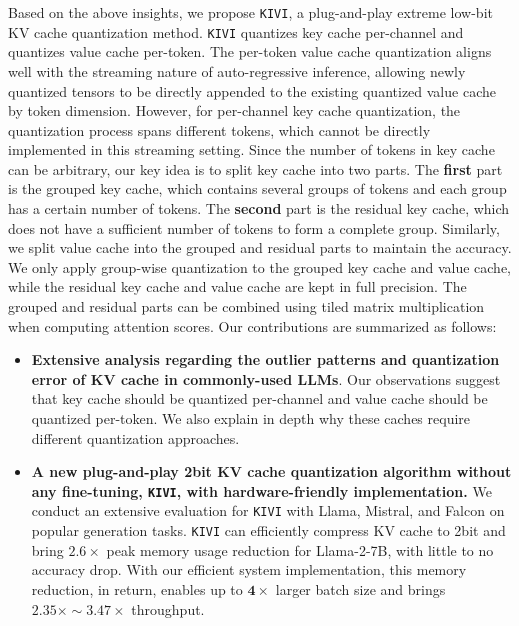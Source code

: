 Based on the above insights, we propose \texttt{KIVI}, a plug-and-play extreme low-bit KV cache quantization method.
\texttt{KIVI} quantizes key cache per-channel and quantizes value cache per-token. The per-token value cache quantization aligns well with the streaming nature of auto-regressive inference, allowing newly quantized tensors to be directly appended to the existing quantized value cache by token dimension. However, for per-channel key cache quantization, the quantization process spans different tokens, which cannot be directly implemented in this streaming setting. Since the number of tokens in key cache can be arbitrary, our key idea is to split key cache into two parts. The \textbf{first} part is the grouped key cache, which contains several groups of tokens and each group has a certain number of tokens. The \textbf{second} part is the residual key cache, which does not have a sufficient number of tokens to form a complete group. Similarly, we split value cache into the grouped and residual parts to maintain the accuracy. We only apply group-wise quantization to the grouped key cache and value cache, while the residual key cache and value cache are kept in full precision. The grouped and residual parts can be combined using tiled matrix multiplication when computing attention scores. Our contributions are summarized as follows:

\begin{itemize}
    \item \textbf{Extensive analysis regarding the outlier patterns and quantization error of KV cache in commonly-used LLMs}. Our observations suggest that key cache should be quantized per-channel and value cache should be quantized per-token. We also explain in depth why these caches require different quantization approaches.

     \item \textbf{A new plug-and-play 2bit KV cache quantization algorithm without any fine-tuning, \texttt{KIVI}, with hardware-friendly implementation.} We conduct an extensive evaluation for \texttt{KIVI} with Llama, Mistral, and Falcon on popular generation tasks.
    \texttt{KIVI} can efficiently compress KV cache to 2bit and bring $\mathbf{2.6\times}$ peak memory usage reduction for Llama-2-7B, with little to no accuracy drop. With our efficient system implementation, this memory reduction, in return, enables up to $\mathbf{4\times}$ larger batch size and brings $\mathbf{2.35\times \sim 3.47\times}$ throughput. 

\end{itemize}

